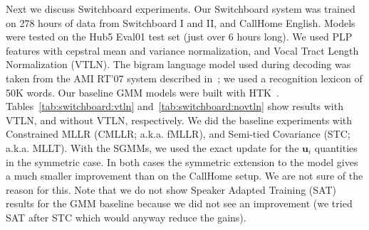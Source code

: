 \documentclass{article}
\def\u{{\mathbf u}}
\begin{document}
Next we discuss Switchboard experiments.  Our Switchboard system was trained on
278 hours of data from Switchboard I and II, and CallHome English.  Models were
tested on the Hub5 Eval01 test set (just over 6 hours long).  We used PLP
features with cepstral mean and variance normalization, and Vocal Tract Length
Normalization (VTLN).  The bigram language model used during decoding was taken
from the AMI RT'07 system described in~\cite{NIST:2007}; we used a recognition
lexicon of 50K words.  Our baseline GMM models were built with
HTK~\cite{htkbook}.  Tables~\ref{tab:switchboard:vtln}
and~\ref{tab:switchboard:novtln} show results with VTLN, and without VTLN,
respectively.  We did the baseline experiments with Constrained MLLR (CMLLR; a.k.a. fMLLR), 
and Semi-tied Covariance (STC; a.k.a. MLLT).  With the SGMMs, 
we used the exact update for the $\u_i$ quantities in the symmetric case.  
In both cases the symmetric extension to the model gives a much smaller
improvement than on the CallHome setup.  We are not sure of the reason for this.
Note that we do not show Speaker Adapted Training (SAT) results for the GMM baseline
because we did not see an improvement (we tried SAT after STC which would anyway
reduce the gains).  




\end{document}
